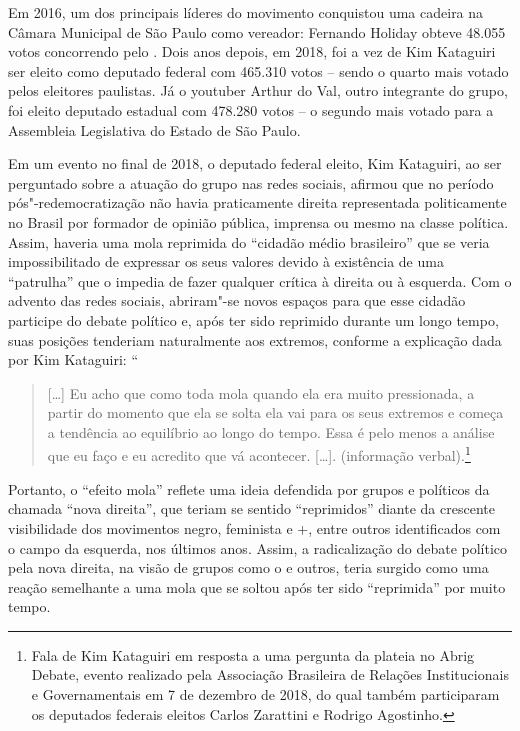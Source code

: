 Em 2016, um dos principais líderes do movimento conquistou uma cadeira
na Câmara Municipal de São Paulo como vereador: Fernando Holiday obteve
48.055 votos concorrendo pelo . Dois anos depois, em 2018, foi a vez
de Kim Kataguiri ser eleito como deputado federal com 465.310 votos --
sendo o quarto mais votado pelos eleitores paulistas. Já o youtuber
Arthur do Val, outro integrante do grupo, foi eleito deputado estadual
com 478.280 votos -- o segundo mais votado para a Assembleia Legislativa
do Estado de São Paulo.

Em um evento no final de 2018, o deputado federal eleito, Kim Kataguiri,
ao ser perguntado sobre a atuação do grupo nas redes sociais, afirmou
que no período pós"-redemocratização não havia praticamente direita
representada politicamente no Brasil por formador de opinião pública,
imprensa ou mesmo na classe política. Assim, haveria uma mola reprimida
do ``cidadão médio brasileiro'' que se veria impossibilitado de
expressar os seus valores devido à existência de uma ``patrulha'' que o
impedia de fazer qualquer crítica à direita ou à esquerda. Com o advento
das redes sociais, abriram"-se novos espaços para que esse cidadão
participe do debate político e, após ter sido reprimido durante um longo
tempo, suas posições tenderiam naturalmente aos extremos, conforme a
explicação dada por Kim Kataguiri: ``

\begin{quote}
{[}\ldots{}{]} Eu acho que como toda mola quando ela era muito pressionada, a
partir do momento que ela se solta ela vai para os seus extremos e
começa a tendência ao equilíbrio ao longo do tempo. Essa é pelo menos a
análise que eu faço e eu acredito que vá acontecer. {[}\ldots{}{]}.
(informação verbal).\footnote{Fala de Kim Kataguiri em resposta a uma
  pergunta da plateia no Abrig Debate, evento realizado pela Associação
  Brasileira de Relações Institucionais e Governamentais em 7 de
  dezembro de 2018, do qual também participaram os deputados federais
  eleitos Carlos Zarattini e Rodrigo Agostinho.}
\end{quote}

Portanto, o ``efeito mola'' reflete uma ideia defendida por grupos e
políticos da chamada ``nova direita'', que teriam se sentido
``reprimidos'' diante da crescente visibilidade dos movimentos negro,
feminista e +, entre outros identificados com o campo da esquerda,
nos últimos anos. Assim, a radicalização do debate político pela nova
direita, na visão de grupos como o  e outros, teria surgido como uma
reação semelhante a uma mola que se soltou após ter sido ``reprimida''
por muito tempo.

